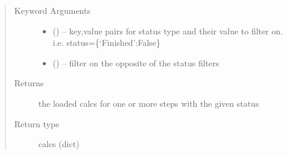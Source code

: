 \documentclass[letterpaper,10pt,english]{sphinxmanual}
\begin{document}
\begin{fulllineitems}
\begin{fulllineitems}
\begin{quote}
\begin{description}
\item[{Keyword Arguments}] \leavevmode\begin{itemize}
\item {} 
 () -- key,value pairs for status type and their value to filter on.
i.e. status=\{`Finished':False\}

\item {} 
 () -- filter on the opposite of the status filters

\end{itemize}

\item[{Returns}] \leavevmode
the loaded calcs for one or more steps with the given status

\item[{Return type}] \leavevmode
calcs (dict)

\end{description}\end{quote}

\end{fulllineitems}


\begin{fulllineitems}
\label{\detokenize{prep:prep.init.values}}
\end{fulllineitems}


\end{fulllineitems}

\end{document}
